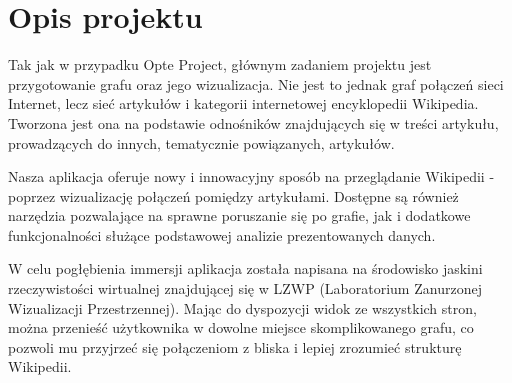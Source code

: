 \section{Opis projektu}
Tak jak w przypadku Opte Project, głównym zadaniem projektu jest przygotowanie grafu oraz jego wizualizacja. Nie jest to jednak graf połączeń sieci Internet, lecz sieć artykułów i kategorii internetowej encyklopedii Wikipedia. Tworzona jest ona na podstawie odnośników znajdujących się w treści artykułu, prowadzących do innych, tematycznie powiązanych, artykułów.

Nasza aplikacja oferuje nowy i innowacyjny sposób na przeglądanie Wikipedii - poprzez wizualizację połączeń pomiędzy artykułami. Dostępne są również narzędzia pozwalające na sprawne poruszanie się po grafie, jak i dodatkowe funkcjonalności służące podstawowej analizie prezentowanych danych.

W celu pogłębienia immersji aplikacja została napisana na środowisko jaskini rzeczywistości wirtualnej znajdującej się w LZWP (Laboratorium Zanurzonej Wizualizacji Przestrzennej). Mając do dyspozycji widok ze wszystkich stron, można przenieść użytkownika w dowolne miejsce skomplikowanego grafu, co pozwoli mu przyjrzeć się połączeniom z bliska i lepiej zrozumieć strukturę Wikipedii.
